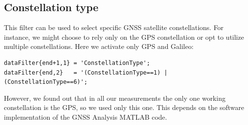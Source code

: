 \subsection{Constellation type}
\label{subsec:constellation_type}
This filter can be used to select specific GNSS satellite constellations. For instance, we might choose to rely only on the GPS constellation or opt to utilize multiple constellations. Here we activate only GPS and Galileo:
\begin{lstlisting}
dataFilter{end+1,1} = 'ConstellationType'; 
dataFilter{end,2}   = '(ConstellationType==1) | (ConstellationType==6)';
\end{lstlisting}
However, we found out that in all our measurements the only one working constellation is the GPS, so we used only this one. This depends on the software implementation of the GNSS Analysis MATLAB code. 